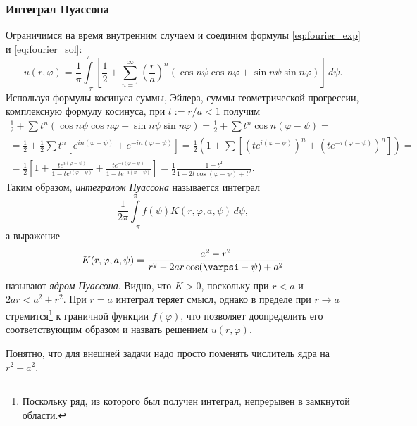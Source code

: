 \subsubsection{Интеграл Пуассона}
Ограничимся на время внутренним случаем и соединим формулы
\eqref{eq:fourier_exp} и \eqref{eq:fourier_sol}:
\[
  u(r,\varphi) = \frac{1}{\pi} \int\limits_{-\pi}^{\pi} \left[ \frac{1}{2} + \sum_{n=1}^\infty \left(
  \frac{r}{a} \right)^n (\cos n\psi\cos n\varphi + \sin n\psi \sin n\varphi
)\right] \, d\psi.
\]
Используя формулы косинуса суммы, Эйлера, суммы геометрической прогрессии,
комплексную формулу косинуса, при
$ t := r/a < 1 $ получим
\begin{multline*}
    \frac{1}{2} + \sum t^n(\cos n\psi \cos n\varphi + \sin n\psi \sin n\varphi)
    = \frac{1}{2} + \sum t^n \cos n(\varphi - \psi) =\\=
    \frac{1}{2} + \frac{1}{2}\sum t^n \left[ e^{in(\varphi-\psi)} +
    e^{-in(\varphi - \psi)} \right] = \frac{1}{2} \left( 1 + \sum \left[
(te^{i(\varphi - \psi)})^n + (te^{-i(\varphi - \psi)})^n \right]  \right) =\\=
  \frac{1}{2} \left[ 1 + \frac{te^{i(\varphi - \psi)}}{1 - te^{i(\varphi-\psi)}}
    + \frac{te^{-i(\varphi - \psi)}}{1 - te^{-i(\varphi-\psi)}}\right] =
    \frac{1}{2} \frac{1 - t^2}{1 - 2t\cos(\varphi - \psi) + t^2}.
\end{multline*}
Таким образом, \emph{интегралом Пуассона} называется интеграл 
\[
    \frac{1}{2\pi} \int\limits_{-\pi}^{\pi}f(\psi) K(r, \varphi, a,
    \psi)\,d\psi,
\]
а выражение  
\[
    K(r,\varphi, a,\psi) = \frac{a^2 - r^2}{r^2 - 2ar\cos(\varpsi-\psi) + a^2}
\]
называют \emph{ядром Пуассона}. Видно, что $ K > 0 $, поскольку при $ r < a $ и
$ 2ar < a^2 + r^2 $. При $ r = a $ интеграл теряет смысл, однако в пределе при
$ r \to a $ стремится\footnote{Поскольку ряд, из
которого был получен интеграл, непрерывен в замкнутой области.} к граничной функции $ f(\varphi) $, что позволяет
доопределить его соответствующим образом и назвать решением $
u(r,\varphi) $.

Понятно, что для внешней задачи надо просто
поменять числитель ядра на $ r^2 - a^2 $.
